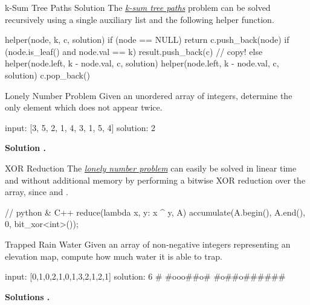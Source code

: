 \documentclass{cognito}
\begin{document}
\begin{note}{k-Sum Tree Paths Solution}
	The \hyperref[note:k-Sum Tree Paths]{\it k-sum tree paths} problem can be solved recursively
	using a single auxiliary list  and the following helper function.
	\begin{largecode}
 helper(node, k, c, solution)
 	if (node == NULL) return
	c.push_back(node)
	if (node.is_leaf() and node.val == k)
		result.push_back(c) // copy!
	else
		helper(node.left, k - node.val, c, solution)
		helper(node.left, k - node.val, c, solution)
	c.pop_back()
	\end{largecode}
	\vspace{-5pt}
\end{note}

\begin{note}{Lonely Number Problem}
	Given an unordered array  of integers, determine the only element which does not appear twice.
	\begin{largecode}
 input: [3, 5, 2, 1, 4, 3, 1, 5, 4]
 solution: 2
	\end{largecode}
	\bf Solution \hyperref[note:XOR Reduction]{\solutionref}.
\end{note}

\begin{note}{XOR Reduction}
	The \hyperref[note:Lonely Number Problem]{\it lonely number problem} can easily be
	solved in linear time and without additional memory by performing a bitwise XOR reduction
	over the array, since  and .
	\begin{largecode}
 // python & C++
 reduce(lambda x, y: x ^ y, A)
 accumulate(A.begin(), A.end(), 0, bit_xor<int>());
	\end{largecode}
	\vspace{-5pt}
\end{note}

\begin{note}{Trapped Rain Water}
	Given an array  of non-negative integers representing an elevation map,
	compute how much water it is able to trap.
	
	\begin{largecode}
 input: [0,1,0,2,1,0,1,3,2,1,2,1]
 solution: 6
       #
   #ooo##o#
 #o##o######
	\end{largecode}
	\bf Solutions \hyperref[note:Trapped Rain Water DP]{\solutionref}
		\hyperref[note:Trapped Rain Water Stack]{\solutionref}
		\hyperref[note:Trapped Rain Water Pointers]{\solutionref}.
\end{note}
\end{document}
